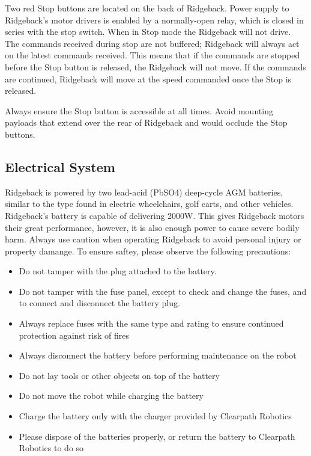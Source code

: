 \documentclass[]{clearpath-latex/clearpath-manual}
\begin{document}
Two red Stop buttons are located on the back of Ridgeback. Power supply to Ridgeback's motor drivers is enabled by a normally-open relay, which is closed in series with the stop switch. When in Stop mode the Ridgeback will not drive. The commands received during stop are not buffered; Ridgeback will always act on the latest commands received. This means that if the commands are stopped before the Stop button is released, the Ridgeback will not move. If the commands are continued, Ridgeback will move at the speed commanded once the Stop is released.

Always ensure the Stop button is accessible at all times. Avoid mounting payloads that extend over the rear of Ridgeback and would occlude the Stop buttons.

\subsection{Electrical System}

Ridgeback is powered by two lead-acid (PbSO4) deep-cycle AGM batteries, similar to the type found in electric wheelchairs, golf carts, and other vehicles. Ridgeback's battery is capable of delivering 2000W. This gives Ridgeback motors their great performance, however, it is also enough power to cause severe bodily harm. Always use caution when operating Ridgeback to avoid personal injury or property damange.  To ensure saftey, please observe the following precautions:

\begin{itemize}[nolistsep]
	\item Do not tamper with the plug attached to the battery.
	\item Do not tamper with the fuse panel, except to check and change the fuses, and to connect and disconnect the 	battery plug.
	\item Always replace fuses with the same type and rating to ensure continued protection against risk of fires
	\item Always disconnect the battery before performing maintenance on the robot
	\item Do not lay tools or other objects on top of the battery
	\item Do not move the robot while charging the battery
	\item Charge the battery only with the charger provided by Clearpath Robotics
	\item Please dispose of the batteries properly, or return the battery to Clearpath Robotics to do so
\end{itemize}
\end{document}
